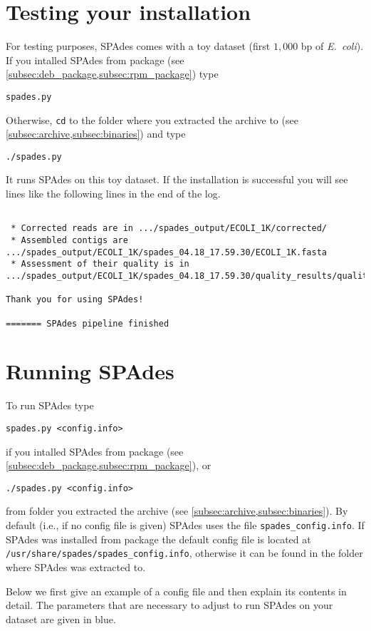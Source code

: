 \documentclass{article}
\def\spades{SPAdes}
\def\ecoli{\it E.~coli}
\begin{document}
\section{Testing your installation}
For testing purposes, {\spades} comes with a toy dataset (first $1{,}000$ bp of {\ecoli}).
If you intalled {\spades} from package 
(see \cref{subsec:deb_package,subsec:rpm_package}) type
\begin{lstlisting}
spades.py
\end{lstlisting}
Otherwise, {\tt cd} to the folder where you extracted the archive to
(see \cref{subsec:archive,subsec:binaries}) and type
\begin{lstlisting}
./spades.py
\end{lstlisting}
It runs {\spades} on this toy dataset.
If the installation is successful you will see lines like the following lines in the end of the log.
\begin{lstlisting}

 * Corrected reads are in .../spades_output/ECOLI_1K/corrected/
 * Assembled contigs are .../spades_output/ECOLI_1K/spades_04.18_17.59.30/ECOLI_1K.fasta
 * Assessment of their quality is in 
.../spades_output/ECOLI_1K/spades_04.18_17.59.30/quality_results/quality.txt

Thank you for using SPAdes!

======= SPAdes pipeline finished
\end{lstlisting}



\section{Running {\spades}}\label{sec:running}
To run {\spades} type
\begin{lstlisting}
spades.py <config.info>
\end{lstlisting}
if you intalled {\spades} from package (see \cref{subsec:deb_package,subsec:rpm_package}), or 
\begin{lstlisting}
./spades.py <config.info>
\end{lstlisting}
from folder you extracted the archive (see \cref{subsec:archive,subsec:binaries}).
By default (i.e., if no config file is given) {\spades} uses the file {\tt spades\_config.info}. 
If {\spades} was installed from package the default config file is located at {\tt  /usr/share/spades/spades\_config.info}, otherwise it can be found in the folder 
where {\spades} was extracted to.


Below we first give an example of a config file
and then explain its contents in detail. The parameters that
are necessary to adjust to run {\spades} on your dataset are given in blue.
\end{document}
